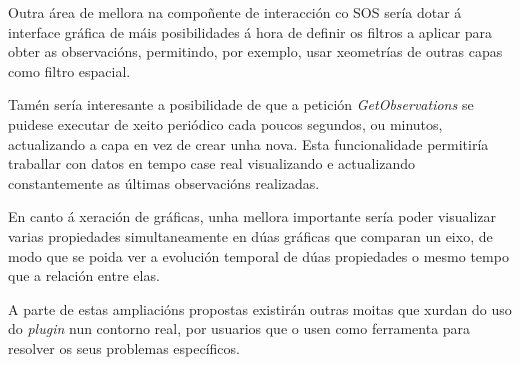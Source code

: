 Outra área de mellora na compoñente de interacción co SOS sería dotar á interface gráfica de máis posibilidades á hora de definir os filtros a aplicar para obter as observacións, permitindo, por exemplo, usar xeometrías de outras capas como filtro espacial.

Tamén sería interesante a posibilidade de que a petición \emph{GetObservations} se puidese executar de xeito periódico cada poucos segundos, ou minutos, actualizando a capa en vez de crear unha nova. Esta funcionalidade permitiría traballar con datos en tempo case real visualizando e actualizando constantemente as últimas observacións realizadas.

En canto á xeración de gráficas, unha mellora importante sería poder visualizar varias propiedades simultaneamente en dúas gráficas que comparan un eixo, de modo que se poida ver a evolución temporal de dúas propiedades o mesmo tempo que a relación entre elas.

A parte de estas ampliacións propostas existirán outras moitas que xurdan do uso do \emph{plugin} nun contorno real, por usuarios que o usen como ferramenta para resolver os seus problemas específicos.